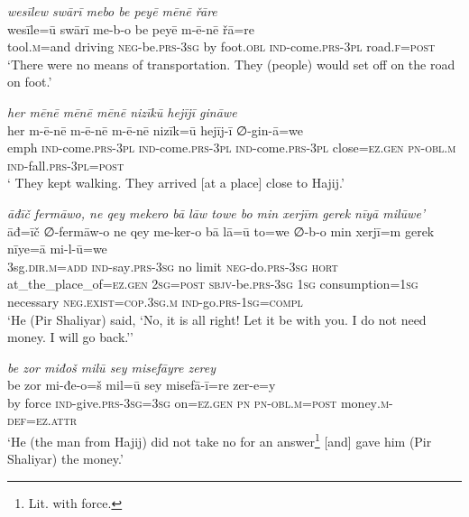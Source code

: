 \ea \label{ŽP.99}
\textit{wesīlew swārī mebo be peyē mēnē řāre} \\ 
\gll wesīle=ū swārī me-b-o be peyē m-ē-nē řā=re \\ 
 tool\textsc{.m}=and driving \textsc{neg-}be\textsc{.prs}\textsc{-3sg} by foot\textsc{.obl} \textsc{ind-}come\textsc{.prs}\textsc{-3pl} road\textsc{.f}\textsc{=\textsc{post}} \\ 
\glt `There were no means of transportation. They (people) would set off on the road on foot.'
\z 
 
\ea \label{ŽP.100}
\textit{her mēnē mēnē mēnē nizīkū hejījī gināwe} \\ 
\gll her m-ē-nē m-ē-nē m-ē-nē nizīk=ū hejīj-ī ∅-gin-ā=we \\ 
 emph \textsc{ind-}come\textsc{.prs}\textsc{-3pl} \textsc{ind-}come\textsc{.prs}\textsc{-3pl} \textsc{ind-}come\textsc{.prs}\textsc{-3pl} close\textsc{\textsc{=ez.gen}} \textsc{pn}\textsc{-obl}\textsc{.m} \textsc{ind-}fall\textsc{.prs}\textsc{-3pl}\textsc{=\textsc{post}} \\ 
\glt ` They kept walking. They arrived [at a place] close to Hajij.'
\z 
 
\ea \label{ŽP.105}
\textit{āđīč fermāwo, ne qey mekero bā lāw towe bo min xerjīm gerek nīyā milūwe’} \\ 
\gll āđ=īč ∅-fermāw-o ne qey me-ker-o bā lā=ū to=we ∅-b-o min xerjī=m gerek nīye=ā mi-l-ū=we \\ 
 3sg\textsc{.dir}\textsc{.m}\textsc{=add} \textsc{ind-}say\textsc{.prs}\textsc{-3sg} no limit \textsc{neg-}do\textsc{.prs}\textsc{-3sg} \textsc{hort} at\_the\_place\_of\textsc{\textsc{=ez.gen}} \textsc{2sg}\textsc{=\textsc{post}} \textsc{sbjv-}be\textsc{.prs}\textsc{-3sg} \textsc{1sg} consumption\textsc{=\textsc{1sg}} necessary \textsc{\textsc{neg.}exist}\textsc{=cop}\textsc{.3sg}\textsc{.m} \textsc{ind-}go\textsc{.prs}\textsc{-\textsc{1sg}}\textsc{=compl} \\ 
\glt `He (Pir Shaliyar) said, ‘No, it is all right! Let it be with you. I do not need money. I will go back.’'
\z 
 
\ea \label{ŽP.107}
\textit{be zor miđoš milū sey misefāyre zerey} \\ 
\gll be zor mi-đe-o=š mil=ū sey misefā-ī=re zer-e=y \\ 
 by force \textsc{ind-}give\textsc{.prs}\textsc{-3sg}\textsc{=3sg} on\textsc{\textsc{=ez.gen}} \textsc{pn} \textsc{pn}\textsc{-obl}\textsc{.m}\textsc{=\textsc{post}} money\textsc{.m}\textsc{-def}\textsc{=ez}.\textsc{attr} \\ 
\glt `He (the man from Hajij) did not take no for an answer\footnote{Lit. with force.} [and] gave him (Pir Shaliyar) the money.'
\z 
 
